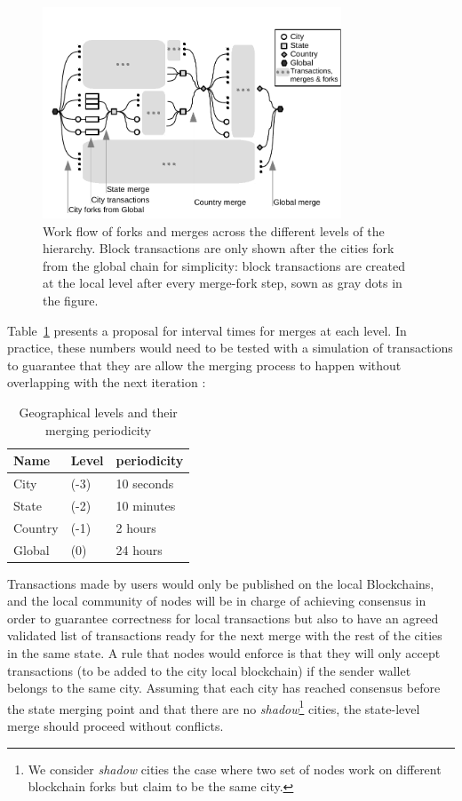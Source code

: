 \begin{figure}
\includegraphics[trim={0.18in 0 0 0},clip,width=3.5in]{figure_fork_merge}
\caption{Work flow of forks and merges across the different levels of the
hierarchy.  Block transactions are only shown after the cities fork from the
global chain for simplicity: block transactions are created at the local level
after every merge-fork step, sown as gray dots in the figure.}
\label{fig:fork-merge}
\end{figure}

Table~\ref{tab:levels} presents a proposal for interval times for merges at each
level.  In practice, these numbers would need to be tested with a simulation of
transactions to guarantee that they are allow the merging process to happen
without overlapping with the next iteration :

\begin{table}
\centering
\begin{tabular}{l l l}
\textbf{Name} & \textbf{Level} & \textbf{periodicity}  \\
\midrule
City  &   (-3) & 10 seconds \\
State &   (-2) & 10 minutes \\
Country & (-1) & 2 hours \\
Global  & (0)  & 24 hours \\
\end{tabular}
\caption{Geographical levels and their merging periodicity}
\label{tab:levels}
\end{table}

Transactions made by users would only be published on the local Blockchains,
and the local community of nodes will be in charge of achieving consensus in
order to guarantee correctness for local transactions but also to have an
agreed validated list of transactions ready for the next merge with the rest of
the cities in the same state.  A rule that nodes would enforce is that they
will only accept transactions (to be added to the city local blockchain) if the
sender wallet belongs to the same city.  Assuming that each city has reached
consensus before the state merging point and that there are no
\textit{shadow}\footnote{We consider \textit{shadow} cities the case where two set of
nodes work on different blockchain forks but claim to be the same city.}
cities, the state-level merge should proceed without conflicts.

